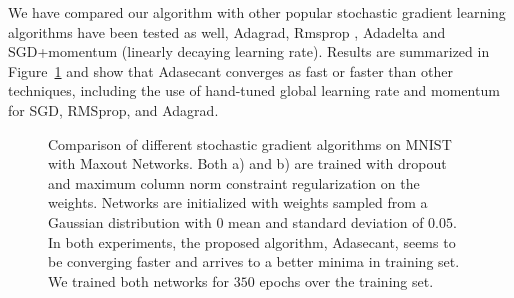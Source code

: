 \documentclass{article}
\begin{document}
We have compared our algorithm with other popular stochastic gradient learning algorithms have been tested as well,
Adagrad, Rmsprop \citep{graves2013generating}, Adadelta \citep{zeiler2012adadelta} and SGD+momentum (linearly decaying learning rate). 
Results are summarized in Figure~\ref{fig:depthexp} and show that Adasecant converges
as fast or faster than other techniques, including the use of hand-tuned global learning rate and momentum for SGD,
RMSprop, and Adagrad.

\begin{figure}[htbp]
\centering
{}
\caption{Comparison of different stochastic gradient algorithms on MNIST with Maxout Networks.
    Both a) and b) are trained with dropout and maximum column norm constraint regularization on
    the weights. Networks are initialized with weights sampled from a Gaussian distribution with
    $0$ mean and standard deviation of $0.05$. In both experiments, the proposed algorithm,
    Adasecant, seems to be converging faster and arrives to a better minima in training set. We trained both
    networks for $350$ epochs over the training set.}
\label{fig:depthexp}
\end{figure}
\end{document}
